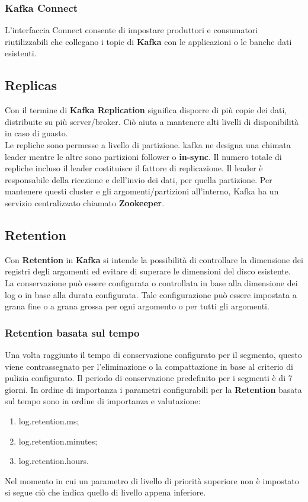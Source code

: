 \documentclass{article}
\begin{document}
 \subsubsection{\textbf{Kafka} Connect}
    L’interfaccia Connect  consente di impostare produttori e consumatori riutilizzabili che collegano i topic di \textbf{Kafka} con le applicazioni o le banche dati esistenti.
\subsection{Replicas}
Con il termine di \textbf{Kafka Replication} significa disporre di più copie dei dati, distribuite su più server/broker.
Ciò aiuta a mantenere alti livelli di disponibilità in caso di guasto. \\Le repliche sono permesse  a livello di partizione. kafka ne designa una chimata leader mentre le altre  sono partizioni follower o \textbf{in-sync}. Il numero totale di repliche incluso il leader costituisce il fattore di replicazione.
Il leader è responsabile della ricezione e dell'invio dei dati, per quella partizione.
Per mantenere questi cluster e gli argomenti/partizioni all'interno, Kafka ha un servizio centralizzato chiamato \textbf{Zookeeper}.

\subsection{Retention}
Con \textbf{Retention} in \textbf{Kafka} si intende la possibilità di controllare la dimensione dei registri degli argomenti ed evitare di superare le dimensioni del disco esistente.\\La conservazione può essere configurata o controllata in base alla dimensione dei log o in base alla durata configurata.
Tale configurazione può essere impostata a grana fine o a grana grossa per ogni argomento o per tutti gli argomenti.\\
\subsubsection{Retention basata sul tempo}
Una volta raggiunto il tempo di conservazione configurato per il segmento, questo viene contrassegnato per l'eliminazione o la compattazione in base al criterio di pulizia configurato. Il periodo di conservazione predefinito per i segmenti è di 7 giorni.
In ordine di importanza i parametri configurabili per la    \textbf{Retention} basata sul tempo sono in ordine di importanza e valutazione:
\begin{enumerate}
    \item log.retention.ms;
    \item log.retention.minutes;
    \item log.retention.hours.
\end{enumerate}
Nel momento in cui un parametro di livello di priorità superiore non è impostato si segue ciò che indica quello di livello appena inferiore.
\end{document}
